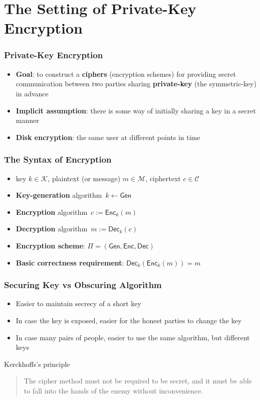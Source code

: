 \section{The Setting of Private-Key Encryption}
\begin{frame}\frametitle{Private-Key Encryption}
\begin{itemize}
\item \textbf{Goal}: to construct a \textbf{ciphers} (encryption schemes) for providing secret communication between two parties sharing \textbf{private-key} (the symmetric-key) in advance
\item \textbf{Implicit assumption}: there is some way of initially sharing a key in a secret manner
\item \textbf{Disk encryption}: the same user at different points in time
\end{itemize}
\end{frame}
\begin{frame}\frametitle{The Syntax of Encryption}
\begin{figure}
\begin{center}

\end{center}
\end{figure}
\begin{itemize}
\item key $k \in \mathcal{K}$, plaintext (or message) $m \in \mathcal{M}$, ciphertext $c \in \mathcal{C}$
\item \textbf{Key-generation} algorithm~$k \gets \mathsf{Gen}$
\item \textbf{Encryption} algorithm~$c:= \mathsf{Enc}_k(m)$
\item \textbf{Decryption} algorithm~$m:= \mathsf{Dec}_k(c)$
\item \textbf{Encryption scheme}: $\Pi = (\mathsf{Gen}, \mathsf{Enc}, \mathsf{Dec})$
\item \textbf{Basic correctness requirement}: $\mathsf{Dec}_k(\mathsf{Enc}_k(m)) = m$
\end{itemize}
\end{frame}
\begin{frame}\frametitle{Securing Key vs Obscuring Algorithm}
\begin{itemize}
\item Easier to maintain secrecy of a short key
\item In case the key is exposed, easier for the honest parties to change the key
\item In case many pairs of people, easier to use the same algorithm, but different keys
\end{itemize}
\begin{alertblock}{Kerckhoffs's principle}
\begin{quote}
The cipher method must not be required to be secret, and it must be able to fall into the hands of the enemy without inconvenience.
\end{quote}	
\end{alertblock}
\end{frame}
